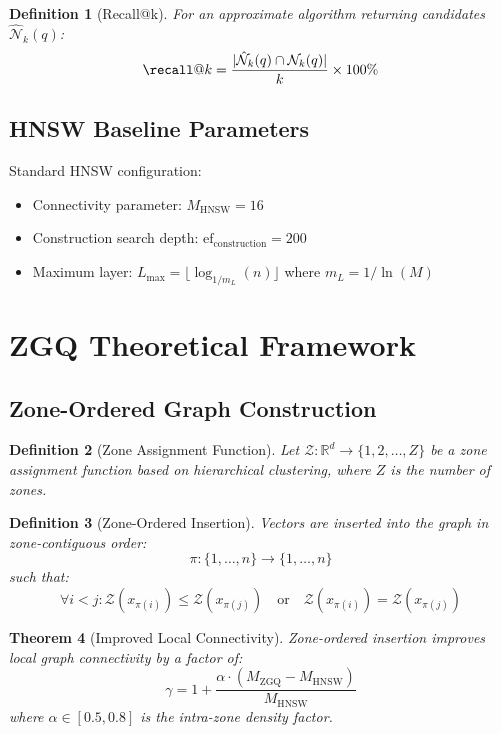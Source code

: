 \documentclass[11pt,a4paper]{article}
\newtheorem{theorem}{Theorem}[section]
\newtheorem{definition}[theorem]{Definition}
\newcommand{\ef}{\text{ef}}
\newcommand{\zgq}{\text{ZGQ}}
\newcommand{\hnsw}{\text{HNSW}}
\begin{document}
\begin{definition}[Recall@k]
For an approximate algorithm returning candidates $\hat{\mathcal{N}}_k(q)$:
\[
\recall@k = \frac{|\hat{\mathcal{N}}_k(q) \cap \mathcal{N}_k(q)|}{k} \times 100\%
\]
\end{definition}

\subsection{HNSW Baseline Parameters}

Standard HNSW configuration:
\begin{itemize}
    \item Connectivity parameter: $M_{\hnsw} = 16$
    \item Construction search depth: $\ef_{\text{construction}} = 200$
    \item Maximum layer: $L_{\max} = \lfloor \log_{1/m_L}(n) \rfloor$ where $m_L = 1/\ln(M)$
\end{itemize}

\section{ZGQ Theoretical Framework}

\subsection{Zone-Ordered Graph Construction}

\begin{definition}[Zone Assignment Function]
Let $\mathcal{Z}: \mathbb{R}^d \rightarrow \{1, 2, \ldots, Z\}$ be a zone assignment function based on hierarchical clustering, where $Z$ is the number of zones.
\end{definition}

\begin{definition}[Zone-Ordered Insertion]
Vectors are inserted into the graph in zone-contiguous order:
\[
\pi: \{1, \ldots, n\} \rightarrow \{1, \ldots, n\}
\]
such that:
\[
\forall i < j: \mathcal{Z}(x_{\pi(i)}) \leq \mathcal{Z}(x_{\pi(j)}) \quad \text{or} \quad \mathcal{Z}(x_{\pi(i)}) = \mathcal{Z}(x_{\pi(j)})
\]
\end{definition}

\begin{theorem}[Improved Local Connectivity]
\label{thm:local-connectivity}
Zone-ordered insertion improves local graph connectivity by a factor of:
\[
\gamma = 1 + \frac{\alpha \cdot (M_{\zgq} - M_{\hnsw})}{M_{\hnsw}}
\]
where $\alpha \in [0.5, 0.8]$ is the intra-zone density factor.
\end{theorem}
\end{document}

